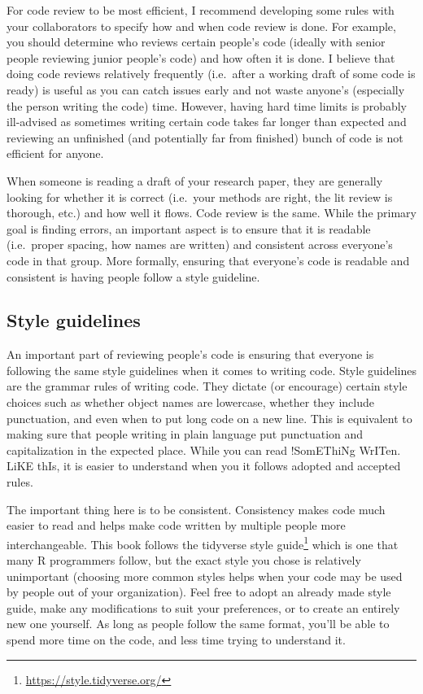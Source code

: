 \documentclass[
]{krantz}
\renewcommand{\href}[2]{#2\footnote{\url{#1}}}
\begin{document}
For code review to be most efficient, I recommend developing some rules with your collaborators to specify how and when code review is done. For example, you should determine who reviews certain people's code (ideally with senior people reviewing junior people's code) and how often it is done. I believe that doing code reviews relatively frequently (i.e.~after a working draft of some code is ready) is useful as you can catch issues early and not waste anyone's (especially the person writing the code) time. However, having hard time limits is probably ill-advised as sometimes writing certain code takes far longer than expected and reviewing an unfinished (and potentially far from finished) bunch of code is not efficient for anyone.

When someone is reading a draft of your research paper, they are generally looking for whether it is correct (i.e.~your methods are right, the lit review is thorough, etc.) and how well it flows. Code review is the same. While the primary goal is finding errors, an important aspect is to ensure that it is readable (i.e.~proper spacing, how names are written) and consistent across everyone's code in that group. More formally, ensuring that everyone's code is readable and consistent is having people follow a style guideline.

\hypertarget{style-guidelines}{%
\subsection{Style guidelines}\label{style-guidelines}}

An important part of reviewing people's code is ensuring that everyone is following the same style guidelines when it comes to writing code. Style guidelines are the grammar rules of writing code. They dictate (or encourage) certain style choices such as whether object names are lowercase, whether they include punctuation, and even when to put long code on a new line. This is equivalent to making sure that people writing in plain language put punctuation and capitalization in the expected place. While you can read !SomEThiNg WrITen. LiKE thIs, it is easier to understand when you it follows adopted and accepted rules.

The important thing here is to be consistent. Consistency makes code much easier to read and helps make code written by multiple people more interchangeable. This book follows the \href{https://style.tidyverse.org/}{tidyverse style guide} which is one that many R programmers follow, but the exact style you chose is relatively unimportant (choosing more common styles helps when your code may be used by people out of your organization). Feel free to adopt an already made style guide, make any modifications to suit your preferences, or to create an entirely new one yourself. As long as people follow the same format, you'll be able to spend more time on the code, and less time trying to understand it.
\end{document}
